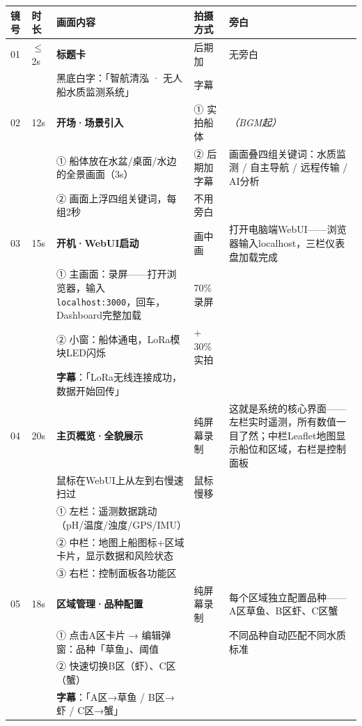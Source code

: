 \documentclass[12pt,a4paper]{article}
\begin{document}
\begin{longtable}{>{\centering\arraybackslash}p{0.7cm}|p{0.9cm}|p{5cm}|p{2.8cm}|p{5.5cm}}
  \toprule
  \textbf{镜号} & \textbf{时长} & \textbf{画面内容} & \textbf{拍摄方式} & \textbf{旁白} \\
  \endhead
  \bottomrule
  \endfoot

  \hline
  \rowcolor{colH}
  01 & $\le$2s & \textbf{标题卡} & 后期加 & 无旁白 \\
  & & 黑底白字：「智航清泓 · 无人船水质监测系统」 & 字幕 & \\
\hline

\rowcolor{colA}
02 & 12s & \textbf{开场·场景引入} & ① 实拍船体 & \textit{（BGM起）} \\
  & & ① 船体放在水盆/桌面/水边的全景画面（3s） & ② 后期加字幕 & 画面叠四组关键词：水质监测 / 自主导航 / 远程传输 / AI分析 \\
  & & ② 画面上浮四组关键词，每组2秒 & 不用旁白 & \\
\hline

\rowcolor{colB}
03 & 15s & \textbf{开机·WebUI启动} & 画中画 & 打开电脑端WebUI——浏览器输入localhost，三栏仪表盘加载完成 \\
  & & ① 主画面：录屏——打开浏览器，输入\texttt{localhost:3000}，回车，Dashboard完整加载 & 70\% 录屏 & \\
  & & ② 小窗：船体通电，LoRa模块LED闪烁 & + 30\% 实拍 & \\
  & & \textbf{字幕}：「LoRa无线连接成功，数据开始回传」 & & \\
\hline

\rowcolor{colC}
04 & 20s & \textbf{主页概览·全貌展示} & 纯屏幕录制 & 这就是系统的核心界面——左栏实时遥测，所有数值一目了然；中栏Leaflet地图显示船位和区域，右栏是控制面板 \\
  & & 鼠标在WebUI上从左到右慢速扫过 & 鼠标慢移 & \\
  & & ① 左栏：遥测数据跳动（pH/温度/浊度/GPS/IMU） & & \\
  & & ② 中栏：地图上船图标+区域卡片，显示数据和风险状态 & & \\
  & & ③ 右栏：控制面板各功能区 & & \\
\hline

\rowcolor{colA}
05 & 18s & \textbf{区域管理·品种配置} & 纯屏幕录制 & 每个区域独立配置品种——A区草鱼、B区虾、C区蟹 \\
  & & ① 点击A区卡片 → 编辑弹窗：品种「草鱼」、阈值 & & 不同品种自动匹配不同水质标准 \\
  & & ② 快速切换B区（虾）、C区（蟹） & & \\
  & & \textbf{字幕}：「A区→草鱼 / B区→虾 / C区→蟹」 & & \\
\hline


\end{longtable}
\end{document}
